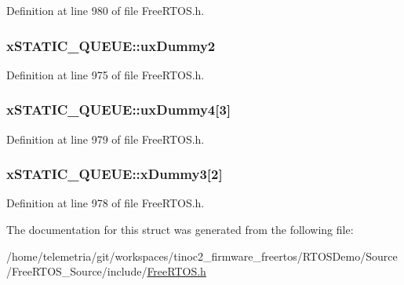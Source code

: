 Definition at line 980 of file Free\+R\+T\+O\+S.\+h.

\subsubsection[{\texorpdfstring{ux\+Dummy2}{uxDummy2}}]{ x\+S\+T\+A\+T\+I\+C\+\_\+\+Q\+U\+E\+U\+E\+::ux\+Dummy2}\hypertarget{structx_s_t_a_t_i_c___q_u_e_u_e_ab4e6a2a0bb59ba54d05927e99afd553f}{}\label{structx_s_t_a_t_i_c___q_u_e_u_e_ab4e6a2a0bb59ba54d05927e99afd553f}


Definition at line 975 of file Free\+R\+T\+O\+S.\+h.

\subsubsection[{\texorpdfstring{ux\+Dummy4}{uxDummy4}}]{ x\+S\+T\+A\+T\+I\+C\+\_\+\+Q\+U\+E\+U\+E\+::ux\+Dummy4\mbox{[}3\mbox{]}}\hypertarget{structx_s_t_a_t_i_c___q_u_e_u_e_a502854697731754ce445f6503d14b127}{}\label{structx_s_t_a_t_i_c___q_u_e_u_e_a502854697731754ce445f6503d14b127}


Definition at line 979 of file Free\+R\+T\+O\+S.\+h.

\subsubsection[{\texorpdfstring{x\+Dummy3}{xDummy3}}]{ x\+S\+T\+A\+T\+I\+C\+\_\+\+Q\+U\+E\+U\+E\+::x\+Dummy3\mbox{[}2\mbox{]}}\hypertarget{structx_s_t_a_t_i_c___q_u_e_u_e_add0de93e08b632124122850bcd543597}{}\label{structx_s_t_a_t_i_c___q_u_e_u_e_add0de93e08b632124122850bcd543597}


Definition at line 978 of file Free\+R\+T\+O\+S.\+h.



The documentation for this struct was generated from the following file\+:\begin{DoxyCompactItemize}
\item 
/home/telemetria/git/workspaces/tinoc2\+\_\+firmware\+\_\+freertos/\+R\+T\+O\+S\+Demo/\+Source/\+Free\+R\+T\+O\+S\+\_\+\+Source/include/\hyperlink{_free_r_t_o_s_8h}{Free\+R\+T\+O\+S.\+h}\end{DoxyCompactItemize}
